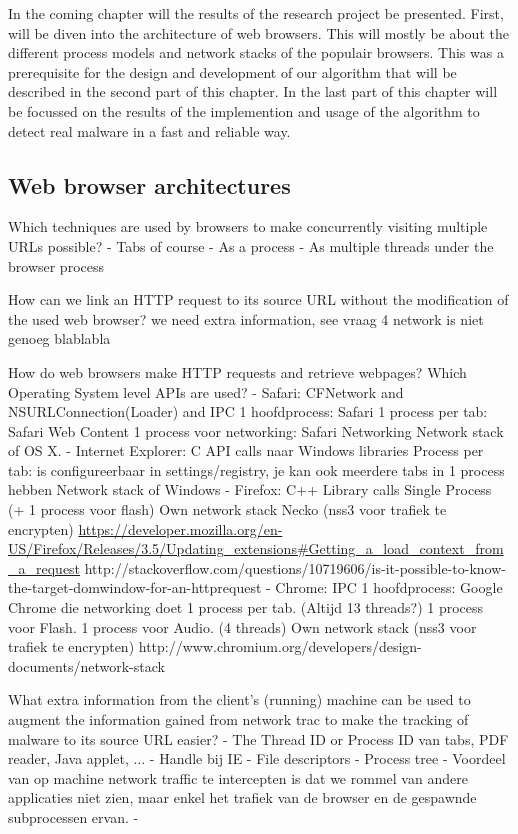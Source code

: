 In the coming chapter will the results of the research project be presented. First, will be diven into the architecture of web browsers. This will mostly be about the different process models and network stacks of the populair browsers. This was a prerequisite for the design and development of our algorithm that will be described in the second part of this chapter. In the last part of this chapter will be focussed on the results of the implemention and usage of the algorithm to detect real malware in a fast and reliable way.

\subsection{Web browser architectures}

Which techniques are used by browsers to make concurrently visiting multiple
URLs possible?
	- Tabs of course
		- As a process
		- As multiple threads under the browser process

How can we link an HTTP request to its source URL without the modification of the used web browser?
we need extra information, see vraag 4
network is niet genoeg blablabla

How do web browsers make HTTP requests and retrieve webpages? Which Operating System level APIs are used?
	- Safari: CFNetwork and NSURLConnection(Loader) and IPC
		1 hoofdprocess: Safari
		1 process per tab: Safari Web Content
		1 process voor networking: Safari Networking
		Network stack of OS X.
	- Internet Explorer: C API calls naar Windows libraries
		Process per tab: is configureerbaar in settings/registry, je kan ook meerdere tabs in 1 process hebben
		Network stack of Windows
	- Firefox: C++ Library calls
		Single Process (+ 1 process voor flash)
		Own network stack Necko (nss3 voor trafiek te encrypten)
		\url{https://developer.mozilla.org/en-US/Firefox/Releases/3.5/Updating_extensions#Getting_a_load_context_from_a_request}
		http://stackoverflow.com/questions/10719606/is-it-possible-to-know-the-target-domwindow-for-an-httprequest
	- Chrome: IPC 
		1 hoofdprocess: Google Chrome die networking doet
		1 process per tab. (Altijd 13 threads?)
		1 process voor Flash.
		1 process voor Audio. (4 threads)
		Own network stack (nss3 voor trafiek te encrypten)
		http://www.chromium.org/developers/design-documents/network-stack

What extra information from the client's (running) machine can be used to augment the information gained from network trac to make the tracking of malware to its source URL easier?  
	- The Thread ID or Process ID van tabs, PDF reader, Java applet, ...
	- Handle bij IE
	- File descriptors
	- Process tree
	- Voordeel van op machine network traffic te intercepten is dat we rommel van andere applicaties niet zien, maar enkel het trafiek van de browser en de gespawnde subprocessen ervan.
	- 

